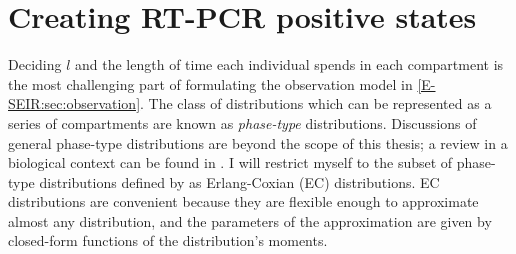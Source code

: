 \documentclass[thesis.tex]{subfiles}
\begin{document}
\chapter{Creating RT-PCR positive states} \label{transmission:sec:phase-type}

Deciding $l$ and the length of time each individual spends in each compartment is the most challenging part of formulating the observation model in \cref{E-SEIR:sec:observation}.
The class of distributions which can be represented as a series of compartments are known as \emph{phase-type} distributions.
Discussions of general phase-type distributions are beyond the scope of this thesis; a review in a biological context can be found in \textcite{hobolthPhasetype}.
I will restrict myself to the subset of phase-type distributions defined by \textcite{osogamiClosed} as Erlang-Coxian (EC) distributions.
EC distributions are convenient because they are flexible enough to approximate almost any distribution, and the parameters of the approximation are given by closed-form functions of the distribution's moments.

\end{document}
